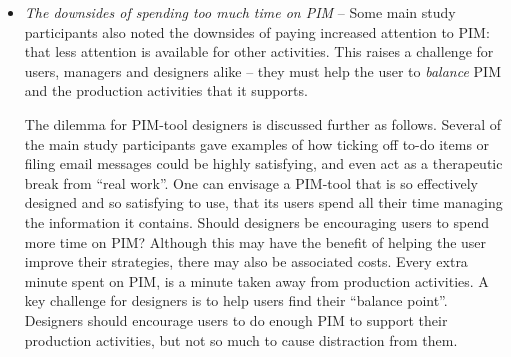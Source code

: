 \begin{itemize}
\item \textit{The downsides of spending too much time on PIM} -- Some main study participants also noted the downsides of paying increased attention to PIM: that less attention is available for other activities. This raises a challenge for users, managers and designers alike -- they must help the user to \textit{balance} PIM and the production activities that it supports.

The dilemma for PIM-tool designers is discussed further as follows.  Several of the main study participants gave examples of how ticking off to-do items or filing email messages could be highly satisfying, and even act as a therapeutic break from ``real work''.    One can envisage a PIM-tool that is so effectively designed and so satisfying to use, that its users spend all their time managing the information it contains.  Should designers be encouraging users to spend more time on PIM?   Although this may have the benefit of helping the user improve their strategies, there may also be associated costs.  Every extra minute spent on PIM, is a minute taken away from production activities.  A key challenge for designers is to help users find their ``balance point''.  Designers should encourage users to do enough PIM to support their production activities, but not so much to cause distraction from them.

\end{itemize}














